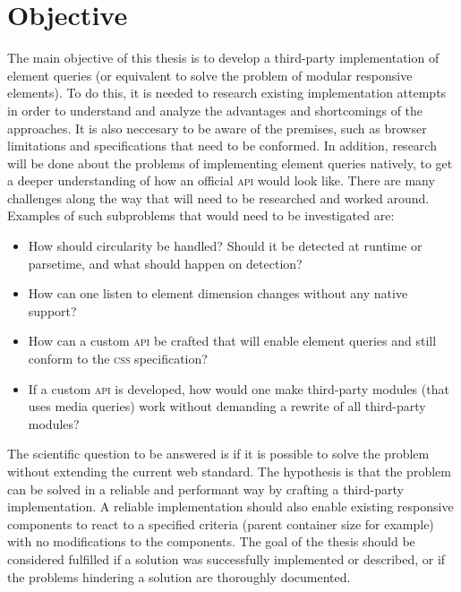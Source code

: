 \documentclass[a4paper,11pt]{kth-mag}
\begin{document}
    \section{Objective}
      The main objective of this thesis is to develop a third-party implementation of element queries (or equivalent to solve the problem of modular responsive elements).
      To do this, it is needed to research existing implementation attempts in order to understand and analyze the advantages and shortcomings of the approaches.
      It is also neccesary to be aware of the premises, such as browser limitations and specifications that need to be conformed.
      In addition, research will be done about the problems of implementing element queries natively, to get a deeper understanding of how an official \textsc{api} would look like.
      There are many challenges along the way that will need to be researched and worked around.
      Examples of such subproblems that would need to be investigated are:
      \begin{itemize}
        \item How should circularity be handled? Should it be detected at runtime or parsetime, and what should happen on detection?
        \item How can one listen to element dimension changes without any native support?
        \item How can a custom \textsc{api} be crafted that will enable element queries and still conform to the \textsc{css} specification?
        \item If a custom \textsc{api} is developed, how would one make third-party modules (that uses media queries) work without demanding a rewrite of all third-party modules?
      \end{itemize}
      The scientific question to be answered is if it is possible to solve the problem  without extending the current web standard.
      The hypothesis is that the problem can be solved in a reliable and performant way by crafting a third-party implementation.
      A reliable implementation should also enable existing responsive components to react to a specified criteria (parent container size for example) with no modifications to the components.
      The goal of the thesis should be considered fulfilled if a solution was successfully implemented or described, or if the problems hindering a solution are thoroughly documented.
\end{document}
